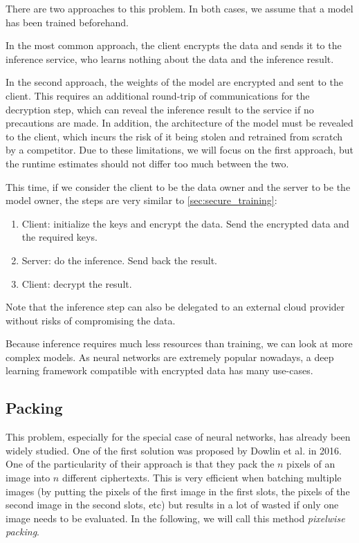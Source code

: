 \documentclass[a4paper,11pt,oneside]{report}
\begin{document}
There are two approaches to this problem. In both cases, we assume that a model has been trained beforehand. 

In the most common approach, the client encrypts the data and sends it to the inference service, who learns nothing about the data and the inference result.

In the second approach, the weights of the model are encrypted and sent to the client. This requires an additional round-trip of communications for the decryption step, which can reveal the inference result to the service if no precautions are made. In addition, the architecture of the model must be revealed to the client, which incurs the risk of it being stolen and retrained from scratch by a competitor. Due to these limitations, we will focus on the first approach, but the runtime estimates should not differ too much between the two.

This time, if we consider the client to be the data owner and the server to be the model owner, the steps are very similar to \autoref{sec:secure_training}:
\begin{enumerate}
    \item Client: initialize the keys and encrypt the data. Send the encrypted data and the required keys.
    \item Server: do the inference. Send back the result.
    \item Client: decrypt the result.
\end{enumerate}

Note that the inference step can also be delegated to an external cloud provider without risks of compromising the data.

Because inference requires much less resources than training, we can look at more complex models. As neural networks are extremely popular nowadays, a deep learning framework compatible with encrypted data has many use-cases.

\subsection{Packing}

This problem, especially for the special case of neural networks, has already been widely studied. One of the first solution was proposed by Dowlin et al. \cite{dowlin_cryptonets_2016} in 2016. One of the particularity of their approach is that they pack the $n$ pixels of an image into $n$ different ciphertexts. This is very efficient when batching multiple images (by putting the pixels of the first image in the first slots, the pixels of the second image in the second slots, etc) but results in a lot of wasted if only one image needs to be evaluated. In the following, we will call this method \emph{pixelwise packing}.
\end{document}
